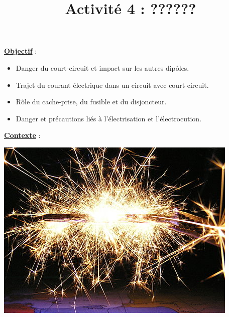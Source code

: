 \documentclass[10pt]{article}
\newcommand{\titreActivite}{Activité 4 : ??????} %
\newcommand{\objectif}{ 	
	
	\begin{itemize}
		\item Danger du court-circuit et impact sur les autres dipôles.
		\item Trajet du courant électrique dans un circuit avec court-circuit.
		\item Rôle du cache-prise, du fusible et du disjoncteur.
		\item Danger et précautions liés à l'électrisation et l'électrocution.
	\end{itemize}
} %
\newcommand{\contexte}{
}
\newcommand{\resumeContexte}{
	} %
\begin{document}
\date{}
\title{\titreActivite}
\maketitle %


\underline{\textbf{Objectif}} :  \vspace{2pt}
\objectif

\vspace{4pt}

\underline{\textbf{Contexte}} :  \textit{\contexte}

\begin{center}
	\includegraphics[width=0.55\columnwidth]{activité.jpg} %
\end{center}

\textbf{\resumeContexte}
\vspace{-12pt}







	
\end{document}
